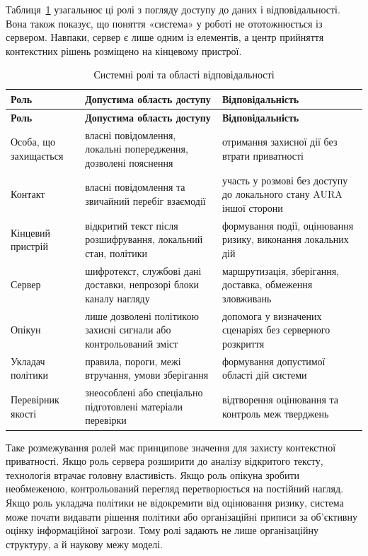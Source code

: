 Таблиця~\ref{tab:roles-responsibility} узагальнює ці ролі з погляду доступу до даних і відповідальності. Вона також показує, що поняття «система» у роботі не ототожнюється із сервером. Навпаки, сервер є лише одним із елементів, а центр прийняття контекстних рішень розміщено на кінцевому пристрої.

\begin{longtable}{p{3.4cm} p{4.9cm} p{4.7cm}}
\caption{Системні ролі та області відповідальності}
\label{tab:roles-responsibility}\\
\toprule
\textbf{Роль} & \textbf{Допустима область доступу} & \textbf{Відповідальність} \\
\midrule
\endfirsthead
\toprule
\textbf{Роль} & \textbf{Допустима область доступу} & \textbf{Відповідальність} \\
\midrule
\endhead
Особа, що захищається & власні повідомлення, локальні попередження, дозволені пояснення & отримання захисної дії без втрати приватності \\
Контакт & власні повідомлення та звичайний перебіг взаємодії & участь у розмові без доступу до локального стану AURA іншої сторони \\
Кінцевий пристрій & відкритий текст після розшифрування, локальний стан, політики & формування події, оцінювання ризику, виконання локальних дій \\
Сервер & шифротекст, службові дані доставки, непрозорі блоки каналу нагляду & маршрутизація, зберігання, доставка, обмеження зловживань \\
Опікун & лише дозволені політикою захисні сигнали або контрольований зміст & допомога у визначених сценаріях без серверного розкриття \\
Укладач політики & правила, пороги, межі втручання, умови зберігання & формування допустимої області дій системи \\
Перевірник якості & знеособлені або спеціально підготовлені матеріали перевірки & відтворення оцінювання та контроль меж тверджень \\
\bottomrule
\end{longtable}

Таке розмежування ролей має принципове значення для захисту контекстної приватності. Якщо роль сервера розширити до аналізу відкритого тексту, технологія втрачає головну властивість. Якщо роль опікуна зробити необмеженою, контрольований перегляд перетворюється на постійний нагляд. Якщо роль укладача політики не відокремити від оцінювання ризику, система може почати видавати рішення політики або організаційні приписи за об'єктивну оцінку інформаційної загрози. Тому ролі задають не лише організаційну структуру, а й наукову межу моделі.

